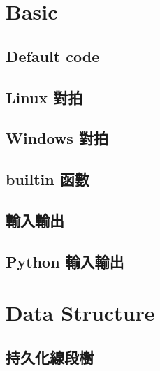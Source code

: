 \documentclass[a4paper,10pt,twocolumn,oneside]{article}
\begin{document}
\pagestyle{fancy}
\fancyfoot{}
\fancyhead[R]{\thepage}
\renewcommand{\headrulewidth}{0.4pt}
\renewcommand{\contentsname}{Contents} 

\scriptsize
\tableofcontents
\section{Basic}
\subsection{Default code}

\subsection{Linux 對拍}

\subsection{Windows 對拍}

\subsection{builtin 函數}

\subsection{輸入輸出}

\subsection{Python 輸入輸出}


\section{Data Structure}
%
\subsection{持久化線段樹}

\end{document}
